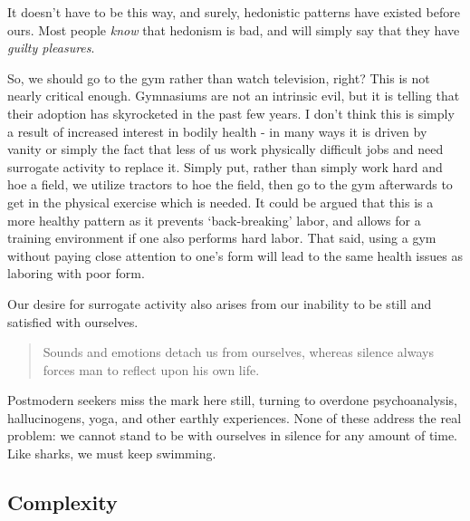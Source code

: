 \documentclass[letterpaper]{article}
\begin{document}
It doesn't have to be this way, and surely, hedonistic patterns have existed before ours. Most people \textit{know} that hedonism is bad, and will simply say that they have \textit{guilty pleasures}.

So, we should go to the gym rather than watch television, right? This is not nearly critical enough. Gymnasiums are not an intrinsic evil, but it is telling that their adoption has skyrocketed in the past few years. I don't think this is simply a result of increased interest in bodily health - in many ways it is driven by vanity or simply the fact that less of us work physically difficult jobs and need surrogate activity to replace it. Simply put, rather than simply work hard and hoe a field, we utilize tractors to hoe the field, then go to the gym afterwards to get in the physical exercise which is needed. It could be argued that this is a more healthy pattern as it prevents `back-breaking' labor, and allows for a training environment if one also performs hard labor. That said, using a gym without paying close attention to one's form will lead to the same health issues as laboring with poor form.

Our desire for surrogate activity also arises from our inability to be still and satisfied with ourselves.

\begin{quote}
  Sounds and emotions detach us from ourselves, whereas silence always forces man to reflect upon his own life.
\end{quote}

Postmodern seekers miss the mark here still, turning to overdone psychoanalysis, hallucinogens, yoga, and other earthly experiences. None of these address the real problem: we cannot stand to be with ourselves in silence for any amount of time. Like sharks, we must keep swimming.

\iffalse
\begin{quote}
  One should remember that it is in accordance with the taste of one's heart that the future eternal mansion will be given, and that the taste in one's heart there will be the very one that is formed here. It is evident that theaters, shows, and similar things are not suitable for Christians.
  \attrib{\textit{The Path to Salvation} 60, St. Theophan the Recluse 1996}
\end{quote}
\fi

\subsection{Complexity}
\end{document}
